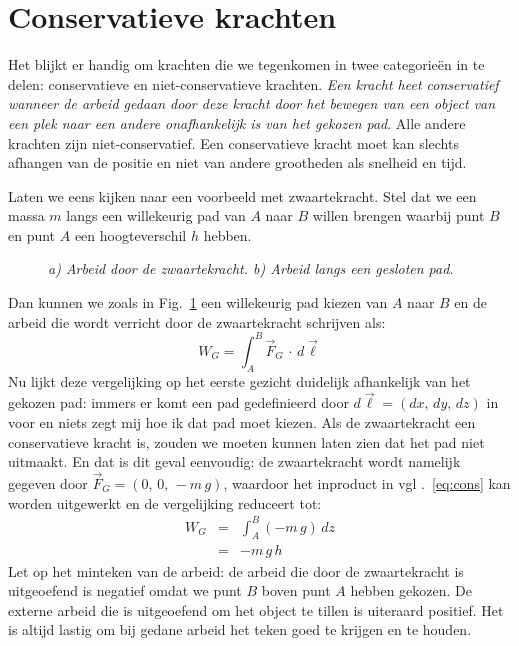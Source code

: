 \section{Conservatieve krachten}

Het blijkt er handig om krachten die we tegenkomen in twee categorie\"{e}n in te delen: 
conservatieve en niet-conservatieve krachten. {\it Een kracht heet conservatief wanneer de arbeid gedaan door
deze kracht door het bewegen van een object van een plek naar een andere onafhankelijk
is van het gekozen pad}. Alle andere krachten zijn niet-conservatief. Een conservatieve 
kracht moet kan slechts afhangen van de positie en niet van andere grootheden als snelheid 
en tijd. 

Laten we eens kijken naar een voorbeeld met zwaartekracht. Stel dat we een massa $m$ langs
een willekeurig pad van $A$ naar $B$ willen brengen waarbij punt $B$ en punt $A$ een
hoogteverschil $h$ hebben. 
 \begin{figure}[htbp]
\begin{center}
\caption{{\it a) Arbeid door de zwaartekracht. b) Arbeid langs een gesloten pad.}}
\label{fig:conservatief}
\end{center}
\end{figure} 
Dan kunnen we zoals in Fig.~\ref{fig:conservatief} een willekeurig
pad kiezen van $A$ naar $B$ en de arbeid die wordt verricht door de zwaartekracht schrijven
als:
\begin{equation}\label{eq:cons}
W_G = \int_A^B \vec{F}_G\,\cdot\,d\vec{\ell}
\end{equation}
Nu lijkt deze vergelijking op het eerste gezicht duidelijk afhankelijk van het gekozen pad:
immers er komt een pad gedefinieerd door $d\vec{\ell}=(dx,\,dy,\,dz)$ in voor en niets zegt 
mij hoe ik dat pad moet kiezen. Als de zwaartekracht een conservatieve kracht is, zouden 
we moeten kunnen laten zien dat het pad niet uitmaakt. En dat is dit geval eenvoudig: de 
zwaartekracht wordt namelijk gegeven door $\vec{F}_G=(0,\,0,\,-m\,g)$, waardoor  het
inproduct in vgl .~\ref{eq:cons} kan worden uitgewerkt en de vergelijking reduceert tot:
\begin{eqnarray}
W_G & = & \int_A^B (-m\,g)\,dz \\
          & = & -m\,g\,h
\end{eqnarray}
Let op het minteken van de arbeid: de arbeid die door de zwaartekracht is uitgeoefend 
is negatief omdat we punt $B$ boven punt $A$ hebben gekozen. De externe arbeid die is 
uitgeoefend om het object te tillen is uiteraard positief. Het is altijd lastig om bij gedane
arbeid het teken goed te krijgen en te houden.


